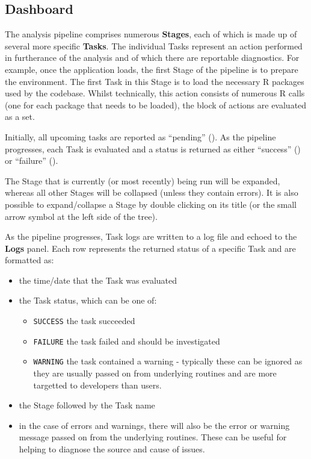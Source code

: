 \documentclass[
  8pt,
  a4paper]{article}
\providecommand{\tightlist}{%
  \setlength{\itemsep}{0pt}\setlength{\parskip}{0pt}}
\begin{document}
\subsection{Dashboard}\label{sec-dashboard}

The analysis pipeline comprises numerous \textbf{Stages}, each of which
is made up of several more specific \textbf{Tasks}. The individual Tasks
represent an action performed in furtherance of the analysis and of
which there are reportable diagnostics. For example, once the
application loads, the first Stage of the pipeline is to prepare the
environment. The first Task in this Stage is to load the necessary R
packages used by the codebase. Whilst technically, this action consists
of numerous R calls (one for each package that needs to be loaded), the
block of actions are evaluated as a set.

Initially, all upcoming tasks are reported as ``pending'' ({}). As the
pipeline progresses, each Task is evaluated and a status is returned as
either ``success'' ({}) or ``failure'' ({}).

The Stage that is currently (or most recently) being run will be
expanded, whereas all other Stages will be collapsed (unless they
contain errors). It is also possible to expand/collapse a Stage by
double clicking on its title (or the small arrow symbol at the left side
of the tree).

As the pipeline progresses, Task logs are written to a log file and
echoed to the \textbf{Logs} panel. Each row represents the returned
status of a specific Task and are formatted as:

\begin{itemize}
\tightlist
\item
  the time/date that the Task was evaluated
\item
  the Task status, which can be one of:

  \begin{itemize}
  \tightlist
  \item
    \texttt{SUCCESS} the task succeeded
  \item
    \texttt{FAILURE} the task failed and should be investigated
  \item
    \texttt{WARNING} the task contained a warning - typically these can
    be ignored as they are usually passed on from underlying routines
    and are more targetted to developers than users.
  \end{itemize}
\item
  the Stage followed by the Task name
\item
  in the case of errors and warnings, there will also be the error or
  warning message passed on from the underlying routines. These can be
  useful for helping to diagnose the source and cause of issues.
\end{itemize}
\end{document}

